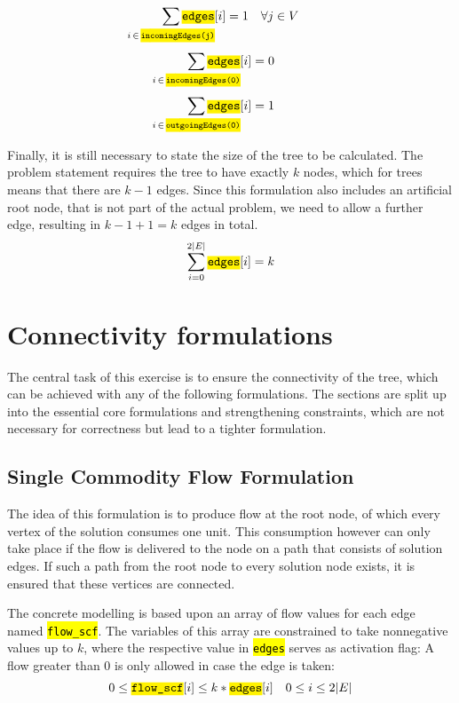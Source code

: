\documentclass[,%
			paper=a4,%
			DIV14,
			liststotoc,
			bibtotoc,
			draft=false,%
			numbers=noendperiod
			]{scrartcl}
\newcommand{\ilc}[1]{\hl{\texttt{#1}}} %
\begin{document}
\begin{equation}\label{eq:oneIncoming}
	\sum_{\mathclap{i\,\in\,\ilc{incomingEdges(j)}}} \ilc{edges}[i] = 1 \quad \forall j \in V
\end{equation}
\begin{equation}\label{eq:root0}
	\sum_{\mathclap{i\,\in\,\ilc{incomingEdges(0)}}} \ilc{edges}[i] = 0
\end{equation}
\begin{equation}\label{eq:root1}
	\sum_{\mathclap{i\,\in\,\ilc{outgoingEdges(0)}}} \ilc{edges}[i] = 1 
\end{equation}

Finally, it is still necessary to state the size of the tree to be calculated.
The problem statement requires the tree to have exactly $k$ nodes, which for trees means that there are $k-1$ edges.
Since this formulation also includes an artificial root node, that is not part of the actual problem, we need to allow a further edge, resulting in $k-1+1=k$ edges in total.
\begin{equation}
	\sum_{i=0}^{2|E|} \ilc{edges}[i] = k
\end{equation}

\section{Connectivity formulations}

The central task of this exercise is to ensure the connectivity of the tree, which can be achieved with any of the following formulations.
The sections are split up into the essential core formulations and strengthening constraints, which are not necessary for correctness but lead to a tighter formulation.

\subsection{Single Commodity Flow Formulation}

The idea of this formulation is to produce flow at the root node, of which every vertex of the solution consumes one unit.
This consumption however can only take place if the flow is delivered to the node on a path that consists of solution edges.
If such a path from the root node to every solution node exists, it is ensured that these vertices are connected.

The concrete modelling is based upon an array of flow values for each edge named \ilc{flow\_scf}.
The variables of this array are constrained to take nonnegative values up to $k$, where the respective value in \ilc{edges} serves as activation flag: A flow greater than 0 is only allowed in case the edge is taken:
\begin{equation}\label{eq:scf1}
	0 \leq \ilc{flow\_scf}[i] \leq k * \ilc{edges}[i] \quad 0 \leq i \leq 2|E|
\end{equation}
\end{document}
